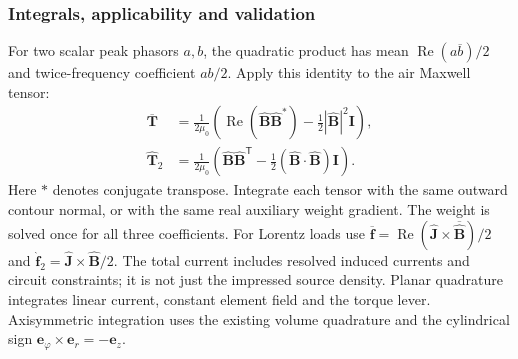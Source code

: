 
\begin{codeexample}[width=0pt]
\end{codeexample}


\subsubsection{Integrals, applicability and validation}
For two scalar peak phasors $a,b$, the quadratic product has mean
$\operatorname{Re}(a\overline b)/2$ and twice-frequency coefficient $ab/2$.
Apply this identity to the air Maxwell tensor:
\[
 \begin{aligned}
 \overline{\mathbf T}&=\frac{1}{2\mu_0}
 \left(\operatorname{Re}(\widehat{\mathbf B}\widehat{\mathbf B}^{*})
       -\tfrac12|\widehat{\mathbf B}|^2\mathbf I\right),\\
 \widehat{\mathbf T}_2&=\frac{1}{2\mu_0}
 \left(\widehat{\mathbf B}\widehat{\mathbf B}^{\mathsf T}
       -\tfrac12(\widehat{\mathbf B}\cdot\widehat{\mathbf B})\mathbf I\right).
 \end{aligned}
\]
Here $*$ denotes conjugate transpose. Integrate each tensor with the same
outward contour normal, or with the same real auxiliary weight gradient.
The weight is solved once for all three coefficients. For Lorentz loads use
$\overline{\mathbf f}=\operatorname{Re}(\widehat{\mathbf J}\times
\overline{\widehat{\mathbf B}})/2$ and
$\widehat{\mathbf f}_2=\widehat{\mathbf J}\times\widehat{\mathbf B}/2$.
The total current includes resolved induced currents and circuit constraints;
it is not just the impressed source density. Planar quadrature integrates
linear current, constant element field and the torque lever. Axisymmetric
integration uses the existing volume quadrature and the cylindrical sign
$\mathbf e_\varphi\times\mathbf e_r=-\mathbf e_z$.

